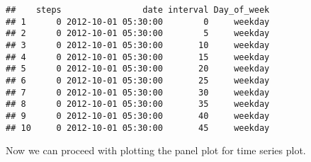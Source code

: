 \documentclass[
]{article}
\newenvironment{Shaded}{\begin{snugshade}}{\end{snugshade}}
\newcommand{\AttributeTok}[1]{\textcolor[rgb]{0.77,0.63,0.00}{#1}}
\newcommand{\DecValTok}[1]{\textcolor[rgb]{0.00,0.00,0.81}{#1}}
\newcommand{\FunctionTok}[1]{\textcolor[rgb]{0.00,0.00,0.00}{#1}}
\newcommand{\NormalTok}[1]{#1}
\newcommand{\OtherTok}[1]{\textcolor[rgb]{0.56,0.35,0.01}{#1}}
\newcommand{\SpecialCharTok}[1]{\textcolor[rgb]{0.00,0.00,0.00}{#1}}
\newcommand{\StringTok}[1]{\textcolor[rgb]{0.31,0.60,0.02}{#1}}
\begin{document}
\begin{Shaded}
\end{Shaded}

\begin{verbatim}
##    steps                date interval Day_of_week
## 1      0 2012-10-01 05:30:00        0     weekday
## 2      0 2012-10-01 05:30:00        5     weekday
## 3      0 2012-10-01 05:30:00       10     weekday
## 4      0 2012-10-01 05:30:00       15     weekday
## 5      0 2012-10-01 05:30:00       20     weekday
## 6      0 2012-10-01 05:30:00       25     weekday
## 7      0 2012-10-01 05:30:00       30     weekday
## 8      0 2012-10-01 05:30:00       35     weekday
## 9      0 2012-10-01 05:30:00       40     weekday
## 10     0 2012-10-01 05:30:00       45     weekday
\end{verbatim}

Now we can proceed with plotting the panel plot for time series plot.
\end{document}
